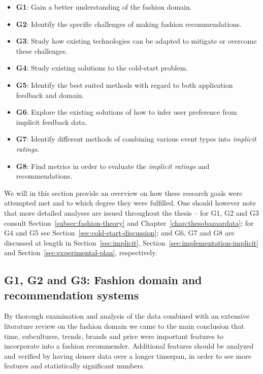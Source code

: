 \begin{itemize}
\item \textbf{G1}: Gain a better understanding of the fashion domain.
\item \textbf{G2}: Identify the specific challenges of making fashion recommendations.
\item \textbf{G3}: Study how existing technologies can be adapted to mitigate or
overcome these challenges.
\vfill
\item \textbf{G4}: Study existing solutions to the cold-start problem.
\item \textbf{G5}: Identify the best suited methods with regard to both application
feedback and domain.
\vfill
\item \textbf{G6}: Explore the existing solutions of how to infer user preference from
implicit feedback data.
\item \textbf{G7}: Identify different methods of combining various event types into
\textit{implicit ratings}.
\item \textbf{G8}: Find metrics in order to evaluate the \emph{implicit ratings} and
recommendations.
\end{itemize}

We will in this section provide an overview on how these research goals were
attempted met and to which degree they were fulfilled. One should however note
that more detailed analyses are issued throughout the thesis -- for G1, G2 and
G3 consult Section~\ref{subsec:fashion-theory} and
Chapter~\ref{chap:thesobazaardata}; for G4 and G5 see
Section~\ref{sec:cold-start-discussion}; and G6, G7 and G8 are discussed at
length in Section~\ref{sec:implicit}, Section~\ref{sec:implementation-implicit} and
Section~\ref{sec:experimental-plan}, respectively.

\subsection{G1, G2 and G3: Fashion domain and recommendation systems}
\label{sec:fashion-discussion}

By thorough examination and analysis of the data combined with an extensive
literature review on the fashion domain we came to the main conclusion that
time, subcultures, trends, brands and price were important features to
incorporate into a fashion recommender. Additional features should be analyzed
and verified by having denser data over a longer timespan, in order to see
more features and statistically significant numbers.

